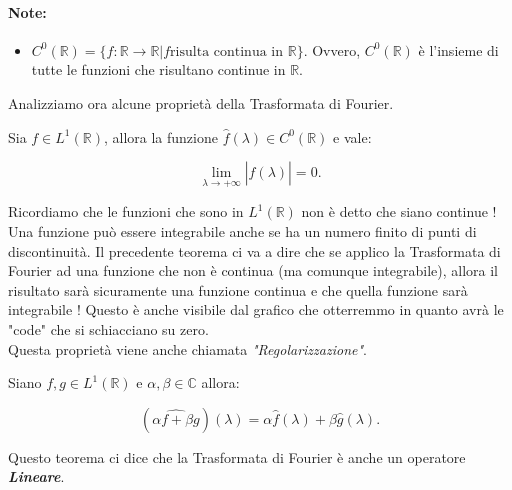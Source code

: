 \paragraph{Note:}
\begin{itemize}
    \item $C^0(\mathbb{R}) = \{ f: \mathbb{R} \rightarrow \mathbb{R} | f \text{
                  risulta continua in } \mathbb{R} \}$. Ovvero, $C^0(\mathbb{R})$ è
          l'insieme di tutte le funzioni che risultano continue in
          $\mathbb{R}$.
\end{itemize}

Analizziamo ora alcune proprietà della Trasformata di Fourier.

\begin{theorem}
    Sia $f \in L^1(\mathbb{R})$, allora la funzione $\hat{f}(\lambda) \in
        C^0(\mathbb{R})$ e vale:
    
    $$
        \lim_{\lambda \rightarrow +\infty} \left| \hat{f}(\lambda) \right| = 0.
    $$
\end{theorem}

Ricordiamo che le funzioni che sono in $L^1(\mathbb{R})$ non è detto che siano
continue ! Una funzione può essere integrabile anche se ha un numero finito di
punti di discontinuità. Il precedente teorema ci va a dire che se applico la
Trasformata di Fourier ad una funzione che non è continua (ma comunque
integrabile), allora il risultato sarà sicuramente una funzione continua e
che quella funzione sarà integrabile ! Questo è anche visibile dal grafico che
otterremmo in quanto avrà le "code" che si schiacciano su zero.\\
Questa proprietà viene anche chiamata \textit{"Regolarizzazione"}.

\begin{theorem}
    Siano $f, g \in L^1(\mathbb{R})$ e $\alpha, \beta \in \mathbb{C}$ allora:
    
    $$
        (\widehat{ \alpha f + \beta g })(\lambda) = \alpha \hat{f}(\lambda) +
        \beta \hat{g}(\lambda).
    $$
\end{theorem}

Questo teorema ci dice che la Trasformata di Fourier è anche un operatore
\textbf{\textit{Lineare}}.\\


